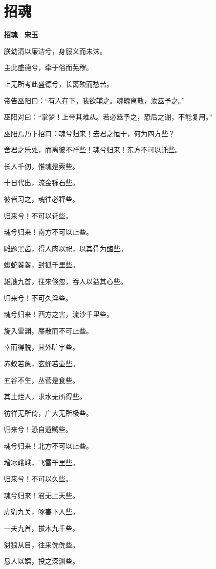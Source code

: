 \documentclass[12pt,a4paper]{ctexbook}
\begin{document}
\section{招魂}
\textbf{招魂　宋玉}\par\vspace{0.5em}
朕幼清以廉洁兮，身服义而未沫。\par
主此盛德兮，牵于俗而芜秽。\par
上无所考此盛德兮，长离殃而愁苦。\par
帝告巫阳曰：“有人在下，我欲辅之。魂魄离散，汝筮予之。”\par
巫阳对曰：“掌梦！上帝其难从。若必筮予之，恐后之谢，不能复用。”\par
巫阳焉乃下招曰：魂兮归来！去君之恒干，何为四方些？\par
舍君之乐处，而离彼不祥些！魂兮归来！东方不可以讬些。\par
长人千仞，惟魂是索些。\par
十日代出，流金铄石些。\par
彼皆习之，魂往必释些。\par
归来兮！不可以讬些。\par
魂兮归来！南方不可以止些。\par
雕题黑齿，得人肉以祀，以其骨为醢些。\par
蝮蛇蓁蓁，封狐千里些。\par
雄虺九首，往来倏忽，吞人以益其心些。\par
归来兮！不可久淫些。\par
魂兮归来！西方之害，流沙千里些。\par
旋入雷渊，爢散而不可止些。\par
幸而得脱，其外旷宇些。\par
赤蚁若象，玄蜂若壶些。\par
五谷不生，丛菅是食些。\par
其土烂人，求水无所得些。\par
彷徉无所倚，广大无所极些。\par
归来兮！恐自遗贼些。\par
魂兮归来！北方不可以止些。\par
增冰峨峨，飞雪千里些。\par
归来兮！不可以久些。\par
魂兮归来！君无上天些。\par
虎豹九关，啄害下人些。\par
一夫九首，拔木九千些。\par
豺狼从目，往来侁侁些。\par
悬人以嬉，投之深渊些。\par
\end{document}

